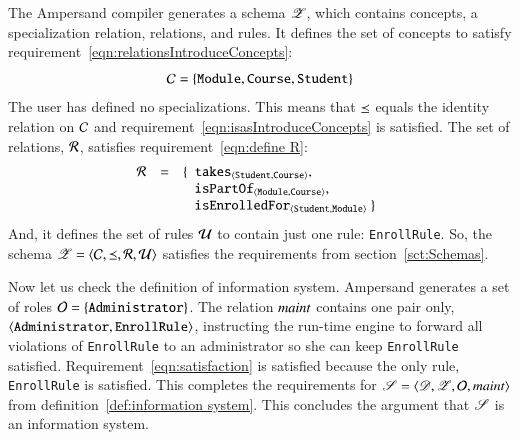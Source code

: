 \documentclass{elsarticle}
\begin{document}
   The Ampersand compiler generates a schema $\mathscr{Z}$, which contains concepts, a specialization relation, relations, and rules.
   It defines the set of concepts to satisfy requirement~\ref{eqn:relationsIntroduceConcepts}:
   \[\mathcal{C}=\{ {\tt Module}, {\tt Course}, {\tt Student}\}\]
   The user has defined no specializations.
   This means that $\preceq$ equals the identity relation on $\mathcal{C}$ and requirement~\ref{eqn:isasIntroduceConcepts} is satisfied.
   The set of relations, $\mathcal{R}$, satisfies requirement~\ref{eqn:define R}:
   \[\begin{array}{rcl}
      \rels&=&\{\begin{array}[t]{l}
                  \declare{\tt takes}{\tt Student}{\tt Course},\\
                  \declare{\tt isPartOf}{\tt Module}{\tt Course},\\
                  \declare{\tt isEnrolledFor}{\tt Student}{\tt Module}\ \}
                \end{array}
     \end{array}
   \]
   And, it defines the set of rules $\mathcal{U}$ to contain just one rule: \verb-EnrollRule-.
   So, the schema $\mathscr{Z}=\langle{\mathcal{C}},{\preceq},{\mathcal{R}},{\mathcal{U}}\rangle$ satisfies the requirements from section~\ref{sct:Schemas}.

   Now let us check the definition of information system.
   Ampersand generates a set of roles $\mathcal{O}=\{{\tt Administrator}\}$.
   The relation $\mathbin{\text{\it maint\/}}$ contains one pair only, $\langle{{\tt Administrator}},{{\tt EnrollRule}}\rangle$,
   instructing the run-time engine to forward all violations of {\tt EnrollRule} to an administrator so she can keep {\tt EnrollRule} satisfied.
   Requirement~\ref{eqn:satisfaction} is satisfied because the only rule, {\tt EnrollRule} is satisfied.
   This completes the requirements for $\mathscr{S}=\langle{\mathscr{D}},{\mathscr{Z}},{\mathcal{O}},{\mathbin{\text{\it maint\/}}}\rangle$ from definition~\ref{def:information system}.
   This concludes the argument that $\mathscr{S}$ is an information system.
\end{document}
